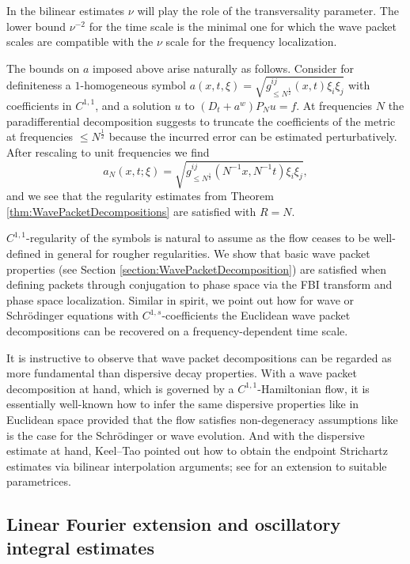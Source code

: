 \documentclass{amsart}
\theoremstyle{definition}
\begin{document}
In the bilinear estimates $\nu$ will play the role of the transversality parameter. The lower bound $\nu^{-2}$ for the time scale is the minimal one for which the wave packet scales are compatible with the $\nu$ scale for the frequency localization. 

The bounds on $a$ imposed above arise naturally as follows. Consider for definiteness a $1$-homogeneous symbol $a(x,t,\xi) = \sqrt{g^{ij}_{\leq N^{\frac{1}{2}}}(x,t) \xi_i \xi_j}$ with coefficients in $C^{1,1}$, and a solution $u$ to $(D_t + a^w) P_N u = f$. At frequencies $N$ the paradifferential decomposition suggests to truncate the coefficients of the metric at frequencies $\leq N^{\frac{1}{2}}$ because the incurred error can be estimated perturbatively. After rescaling to unit frequencies we find
\begin{equation*}
a_N(x,t;\xi) = \sqrt{g^{ij}_{\leq N^{\frac{1}{2}}}(N^{-1} x,N^{-1} t) \xi_i \xi_j},
\end{equation*}
and we see that the regularity estimates from Theorem \ref{thm:WavePacketDecompositions} are satisfied with $R= N$.

\smallskip

$C^{1,1}$-regularity of the symbols is natural to assume as the flow ceases to be well-defined in general for rougher regularities. We show that basic wave packet properties (see Section \ref{section:WavePacketDecomposition}) are satisfied when defining packets through conjugation to phase space via the FBI transform and phase space localization.
Similar in spirit, we point out how for wave or Schr\"odinger equations with $C^{1,s}$-coefficients the Euclidean wave packet decompositions can be recovered on a frequency-dependent time scale.

It is instructive to observe that wave packet decompositions can be regarded as more fundamental than dispersive decay properties. With a wave packet decomposition  at hand, which is governed by a $C^{1,1}$-Hamiltonian flow, it is essentially well-known how to infer the same dispersive properties like in Euclidean space provided that the flow satisfies non-degeneracy assumptions like is the case for the Schr\"odinger or wave evolution. And with the dispersive estimate at hand, Keel--Tao \cite{KeelTao1998} pointed out how to obtain the endpoint Strichartz estimates via bilinear interpolation arguments; see \cite[Theorem~4]{Tataru2000} for an extension to suitable parametrices. 

\smallskip

\subsection{Linear Fourier extension and oscillatory integral estimates}
\end{document}
